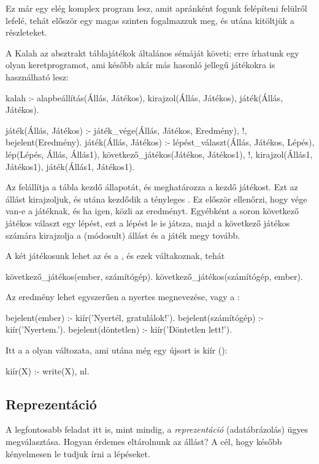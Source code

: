 Ez már egy elég komplex program lesz, amit apránként
fogunk felépíteni felülről lefelé, tehát először
egy magas szinten fogalmazzuk meg, és utána
kitöltjük a részleteket.

A Kalah az absztrakt táblajátékok általános sémáját
követi; erre írhatunk egy olyan keretprogramot, ami
később akár más hasonló jellegű játékokra is
használható lesz:
\begin{program}
kalah :-
    alapbeállítás(Állás, Játékos),
    kirajzol(Állás, Játékos),
    játék(Állás, Játékos).

játék(Állás, Játékos) :-
    játék_vége(Állás, Játékos, Eredmény), !,
    bejelent(Eredmény).
játék(Állás, Játékos) :-
    lépést_választ(Állás, Játékos, Lépés),
    lép(Lépés, Állás, Állás1),
    következő_játékos(Játékos, Játékos1), !,
    kirajzol(Állás1, Játékos1),
    játék(Állás1, Játékos1).
\end{program}

Az  felállítja a tábla kezdő
állapotát, és meghatározza a kezdő játékost. Ezt
az állást kirajzoljuk, és utána kezdődik a tényleges
. Ez először ellenőrzi, hogy vége van-e
a játéknak, és ha igen, közli az
eredményt. Egyébként a soron következő játékos
választ egy lépést, ezt a lépést le is játsza, majd
a következő játékos számára kirajzolja a (módosult)
állást és a játék megy tovább.

A két játékosunk lehet az  és a
, és ezek váltakoznak, tehát
\begin{program}
következő_játékos(ember, számítógép).
következő_játékos(számítógép, ember).
\end{program}

Az eredmény lehet egyszerűen a nyertes megnevezése,
vagy a :
\begin{program}
bejelent(ember) :- kiír('Nyertél, gratulálok!').
bejelent(számítógép) :- kiír('Nyertem.').
bejelent(döntetlen) :- kiír('Döntetlen lett!').
\end{program}

Itt a  a  olyan változata, ami
utána még egy újsort is kiír ():
\begin{program}
kiír(X) :- write(X), nl.
\end{program}

\subsection*{Reprezentáció}
A legfontosabb feladat itt is, mint mindig, a
\emph{reprezentáció} (adatábrázolás) ügyes
megválasztása. Hogyan érdemes eltárolnunk az állást?
A cél, hogy később kényelmesen le tudjuk írni a
lépéseket.

